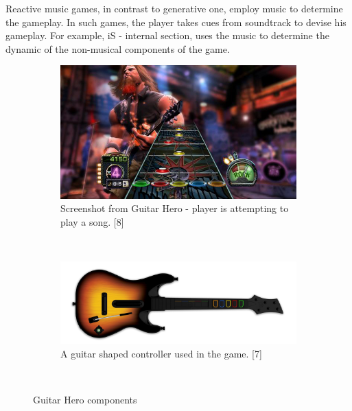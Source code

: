 Reactive music games, in contrast to generative one, employ music to determine the gameplay. In such games, the player takes cues from soundtrack to devise his gameplay. For example, iS - internal section, uses the music to determine the dynamic of the non-musical components of the game.

\begin{figure}
        \centering
        \begin{subfigure}[b]{0.48\textwidth}
                \includegraphics[width=\textwidth]{Figures/guitarhero}
                \caption{Screenshot from Guitar Hero - player is attempting to play a song. [8]}
                \label{fig:Guitar Hero screenshot}
        \end{subfigure}%
        ~ %
        \begin{subfigure}[b]{0.48\textwidth}
                \includegraphics[width=\textwidth]{Figures/controller}
                \caption{A guitar shaped controller used in the game. [7]}
                \label{fig:Controller}
        \end{subfigure}
          \caption{Guitar Hero components}
        ~ %
\end{figure}

